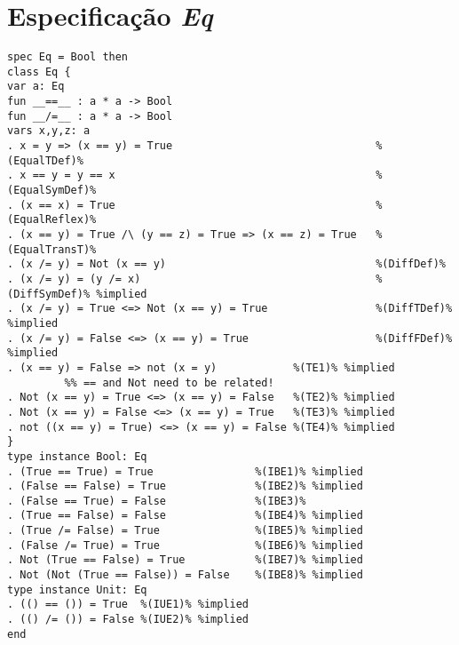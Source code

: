 \section{Especificação \textit{Eq}}
\label{appendix:strictSpec:eq}
\begin{Verbatim}
spec Eq = Bool then
class Eq {
var a: Eq
fun __==__ : a * a -> Bool
fun __/=__ : a * a -> Bool
vars x,y,z: a
. x = y => (x == y) = True                                %(EqualTDef)%
. x == y = y == x                                         %(EqualSymDef)%
. (x == x) = True                                         %(EqualReflex)%
. (x == y) = True /\ (y == z) = True => (x == z) = True   %(EqualTransT)%
. (x /= y) = Not (x == y)                                 %(DiffDef)%
. (x /= y) = (y /= x)                                     %(DiffSymDef)% %implied
. (x /= y) = True <=> Not (x == y) = True                 %(DiffTDef)% %implied
. (x /= y) = False <=> (x == y) = True                    %(DiffFDef)% %implied
. (x == y) = False => not (x = y)            %(TE1)% %implied
         %% == and Not need to be related!
. Not (x == y) = True <=> (x == y) = False   %(TE2)% %implied
. Not (x == y) = False <=> (x == y) = True   %(TE3)% %implied
. not ((x == y) = True) <=> (x == y) = False %(TE4)% %implied
}
type instance Bool: Eq
. (True == True) = True                %(IBE1)% %implied
. (False == False) = True              %(IBE2)% %implied
. (False == True) = False              %(IBE3)%
. (True == False) = False              %(IBE4)% %implied
. (True /= False) = True               %(IBE5)% %implied
. (False /= True) = True               %(IBE6)% %implied
. Not (True == False) = True           %(IBE7)% %implied
. Not (Not (True == False)) = False    %(IBE8)% %implied
type instance Unit: Eq
. (() == ()) = True  %(IUE1)% %implied
. (() /= ()) = False %(IUE2)% %implied
end
\end{Verbatim}

